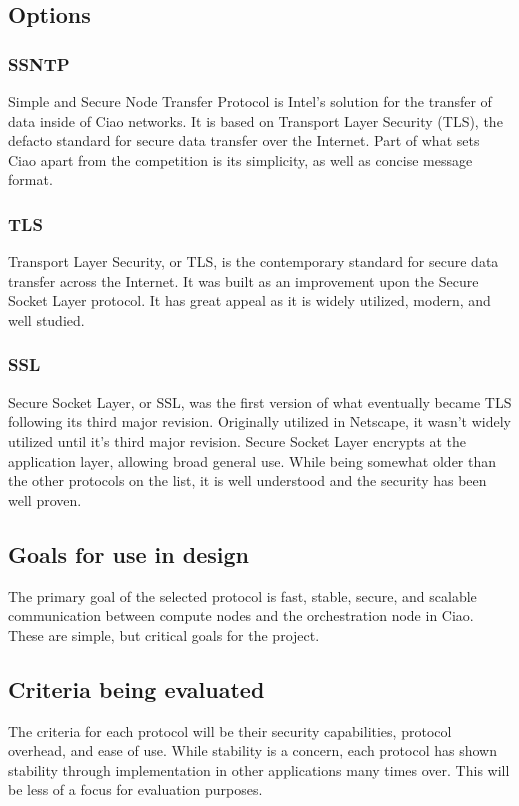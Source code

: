 \documentclass[10pt,letterpaper,onecolumn,draftclsnofoot]{IEEEtran}
\begin{document}
\subsection{Options}

\subsubsection{SSNTP}
Simple and Secure Node Transfer Protocol is Intel's solution for the transfer
of data inside of Ciao networks. It is based on Transport Layer Security (TLS),
the defacto standard for secure data transfer over the Internet. Part of what
sets Ciao apart from the competition is its simplicity, as well as concise
message format.\cite{ssntp}

\subsubsection{TLS}
Transport Layer Security, or TLS, is the contemporary standard for secure data
transfer across the Internet. It was built as an improvement upon the Secure
Socket Layer protocol. It has great appeal as it is widely utilized, modern,
and well studied.\cite{tls}

\subsubsection{SSL}
Secure Socket Layer, or SSL, was the first version of what eventually became
TLS following its third major revision. Originally utilized in Netscape, it
wasn't widely utilized until it's third major revision. Secure Socket Layer
encrypts at the application layer, allowing broad general use. While being
somewhat older than the other protocols on the list, it is well understood and
the security has been well proven.\cite{ssl}

\subsection{Goals for use in design}
The primary goal of the selected protocol is fast, stable, secure, and
scalable communication between compute nodes and the orchestration node in
Ciao. These are simple, but critical goals for the project.

\subsection{Criteria being evaluated}
The criteria for each protocol will be their security capabilities, protocol
overhead, and ease of use. While stability is a concern, each protocol has
shown stability through implementation in other applications many times over.
This will be less of a focus for evaluation purposes.
\end{document}
